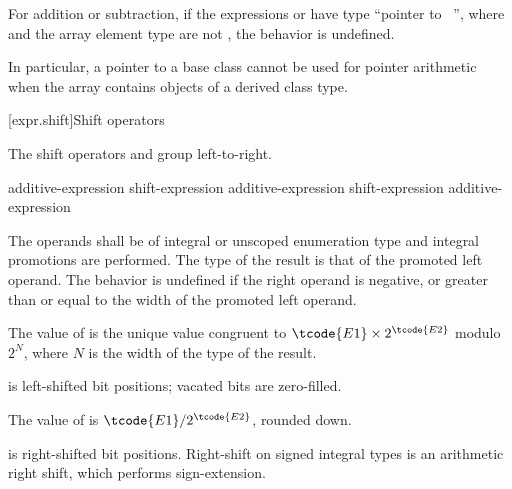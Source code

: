 \pnum
For addition or subtraction, if the expressions  or  have
type ``pointer to \cv{}~'', where  and the array element type
are not , the behavior is undefined.
\begin{note}
In particular, a pointer to a base class cannot be used for
pointer arithmetic when the array contains objects of a derived class type.
\end{note}

[expr.shift]{Shift operators}

\pnum
{}%
%
%
%
%
%
The shift operators \tcode{<<} and \tcode{>>} group left-to-right.

%
%
%
%
%
\begin{bnf}
\br
    additive-expression\br
    shift-expression \terminal{<<} additive-expression\br
    shift-expression \terminal{>>} additive-expression
\end{bnf}

The operands shall be of integral or unscoped enumeration type and integral
promotions are performed. The type of the result is that of the promoted
left operand.
%
The behavior is undefined if the right operand is negative, or greater
than or equal to the width of the promoted left operand.

\pnum
The value of  is the unique value congruent to
$\tcode{E1} \times 2^\tcode{E2}$ modulo $2^N$,
where $N$ is the width of the type of the result.
\begin{note}
 is left-shifted  bit positions;
vacated bits are zero-filled.
\end{note}

\pnum
The value of  is $\tcode{E1} / 2^\tcode{E2}$, rounded down.
\begin{note}
 is right-shifted  bit positions.
Right-shift on signed integral types is an arithmetic right shift,
which performs sign-extension.
\end{note}

